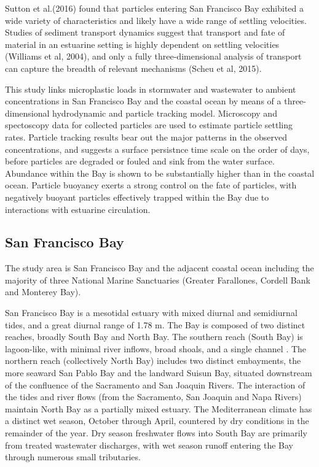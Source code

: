 \documentclass[draft]{jgr/agujournal2019}
\begin{document}
  Sutton et al.(2016) found that particles entering San Francisco Bay
  exhibited a wide variety of characteristics and likely have a wide
  range of settling velocities.  Studies of sediment transport
  dynamics suggest that transport and fate of material in an estuarine
  setting is highly dependent on settling velocities (Williams et al,
  2004), and only a fully three-dimensional analysis of transport can
  capture the breadth of relevant mechanisms (Scheu et al, 2015).
  
  This study links microplastic loads in stormwater and wastewater to
  ambient concentrations in San Francisco Bay and the coastal ocean by
  means of a three-dimensional hydrodynamic and particle tracking
  model.  Microscopy and spectoscopy data for collected particles are
  used to estimate particle settling rates. Particle tracking results
  bear out the major patterns in the observed concentrations, and
  suggests a surface persistnce time scale on the order of days,
  before particles are degraded or fouled and sink from the water
  surface. Abundance within the Bay is shown to be substantially
  higher than in the coastal ocean.  Particle buoyancy exerts a strong
  control on the fate of particles, with negatively buoyant particles
  effectively trapped within the Bay due to interactions with
  estuarine circulation.

\subsection{San Francisco Bay}

The study area is San Francisco Bay and the adjacent coastal ocean
including the majority of three National Marine Sanctuaries (Greater
Farallones, Cordell Bank and Monterey Bay).

San Francisco Bay is a mesotidal estuary with mixed diurnal and
semidiurnal tides, and a great diurnal range of 1.78 m. The Bay is
composed of two distinct reaches, broadly South Bay and North Bay. The
southern reach (South Bay) is lagoon-like, with minimal river inflows,
broad shoals, and a single channel \cite{Conomos1985}.  The northern
reach (collectively North Bay) includes two distinct embayments, the
more seaward San Pablo Bay and the landward Suisun Bay, situated
downstream of the confluence of the Sacramento and San Joaquin
Rivers. The interaction of the tides and river flows (from the
Sacramento, San Joaquin and Napa Rivers) maintain North
Bay as a partially mixed estuary. The Mediterranean climate has a
distinct wet season, October through April, countered by dry
conditions in the remainder of the year.
Dry season freshwater flows into South Bay are primarily from treated wastewater
discharges, with wet season runoff entering the Bay through
numerous small tributaries.
\end{document}
